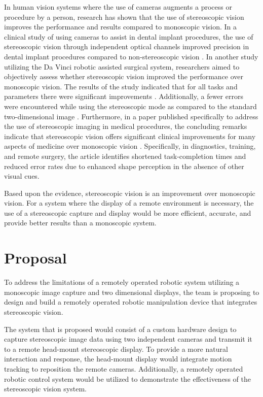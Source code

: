 \documentclass[12pt, journal]{IEEEtran}
\begin{document}
In human vision systems where the use of cameras augments a process or procedure by a person, research has shown that the use of stereoscopic vision improves the performance and results compared to monoscopic vision.  In a clinical study of using cameras to assist in dental implant procedures, the use of stereoscopic vision through independent optical channels improved precision in dental implant procedures compared to non-stereoscopic vision \cite{wanschitz}.  In another study utilizing the Da Vinci robotic assisted surgical system, researchers aimed to objectively assess whether stereoscopic vision improved the performance over monoscopic vision. The results of the study indicated that for all tasks and parameters there were significant improvements \cite{munz}. Additionally, a fewer errors were encountered while using the stereoscopic mode as compared to the standard two-dimensional image \cite{munz}.  Furthermore, in a paper published specifically to address the use of stereoscopic imaging in medical procedures, the concluding remarks indicate that stereoscopic vision offers significant clinical improvements for many aspects of medicine over monoscopic vision \cite{held}.  Specifically, in diagnostics, training, and remote surgery, the article identifies shortened task-completion times and reduced error rates due to enhanced shape perception in the absence of other visual cues.

Based upon the evidence, stereoscopic vision is an improvement over monoscopic vision.  For a system where the display of a remote environment is necessary, the use of a stereoscopic capture and display would be more efficient, accurate, and provide better results than a monoscopic system.

\section{Proposal}
To address the limitations of a remotely operated robotic system utilizing a monoscopic image capture and two dimensional displays, the team is proposing to design and build a remotely operated robotic manipulation device that integrates stereoscopic vision.

The system that is proposed would consist of a custom hardware design to capture stereoscopic image data using two independent cameras and transmit it to a remote head-mount stereoscopic display.  To provide a more natural interaction and response, the head-mount display would integrate motion tracking to reposition the remote cameras.  Additionally, a remotely operated robotic control system would be utilized to demonstrate the effectiveness of the stereoscopic vision system.
\end{document}
